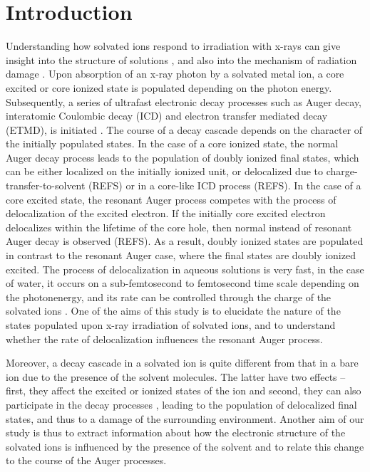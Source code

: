 \section{Introduction}

Understanding how solvated ions respond to irradiation with x-rays can give insight into the structure of solutions \citep{Pokapanich09:7264}, and also into the mechanism of radiation damage \citep{Stumpf16:237}. Upon absorption of an x-ray photon by a solvated metal ion, a core excited or core ionized state is populated depending on the photon energy. Subsequently, a series of ultrafast electronic decay processes such as Auger decay, interatomic Coulombic decay (ICD) and electron transfer mediated decay (ETMD), is initiated \citep{Pokapanich09:7264,Pokapanich11:13430,Stumpf16:237,unger17:708}. The course of a decay cascade depends on the character of the initially populated states. In the case of a core ionized state, the normal Auger decay process leads to the population of doubly ionized final states, which can be either localized on the initially ionized unit, or delocalized due to charge-transfer-to-solvent (REFS)\citep{ceolin17} or in a core-like ICD process (REFS)\citep{Pokapanich09:7264,Pokapanich11:13430}. In the case of a core excited state, the resonant Auger process competes with the process of delocalization of the excited electron. If the initially core excited electron delocalizes within the lifetime of the core hole, then normal instead of resonant Auger decay is observed \citep{ottosson12:1}\citep{Nordlund07:217406}(REFS). As a result, doubly ionized states are populated in contrast to the resonant Auger case, where the final states are doubly ionized excited. The process of delocalization in aqueous solutions is very fast, in the case of water, it occurs on a sub-femtosecond to femtosecond time scale depending on the photonenergy, and its rate can be controlled through the charge of the solvated ions \citep{Nordlund07:217406,Ottosson11:13489}. One of the aims of this study is to elucidate the nature of the states populated upon x-ray irradiation of solvated ions, and to understand whether the rate of delocalization influences the resonant Auger process.


Moreover, a decay cascade in a solvated ion is quite different from that in a bare ion due to the presence of the solvent molecules. The latter have two effects -- first, they affect the excited \citep{miteva16:16671} or ionized states of the ion and second, they can also participate in the decay processes \citep{Pokapanich09:7264,Stumpf16:237}, leading to the population of delocalized final states, and thus to a damage of the surrounding environment. Another aim of our study is thus to extract information about how the electronic structure of the solvated ions is influenced by the presence of the solvent and to relate this change to the course of the Auger processes.


